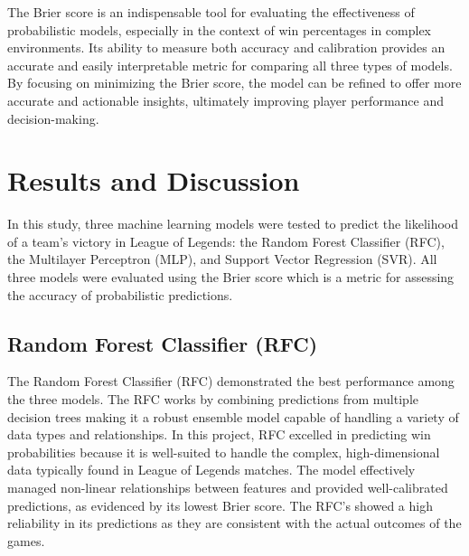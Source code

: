 \documentclass[10pt,twocolumn]{article}
\begin{document}
The Brier score is an indispensable tool for evaluating the effectiveness of probabilistic models, especially in the context of win percentages in complex environments. Its ability to measure both accuracy and calibration provides an accurate and easily interpretable metric for comparing all three types of models. By focusing on minimizing the Brier score, the model can be refined to offer more accurate and actionable insights, ultimately improving player performance and decision-making.


\section{Results and Discussion}

In this study, three machine learning models were tested to predict the likelihood of a team’s victory in League of Legends: the Random Forest Classifier (RFC), the Multilayer Perceptron (MLP), and Support Vector Regression (SVR). All three models were evaluated\cite{hagerty1991comparing} using the Brier score which is a metric for assessing the accuracy of probabilistic predictions.

\subsection{Random Forest Classifier (RFC)}
The Random Forest Classifier (RFC) demonstrated the best performance among the three models. The RFC works by combining predictions from multiple decision trees making it a robust ensemble model capable of handling a variety of data types and relationships. In this project, RFC excelled in predicting win probabilities because it is well-suited to handle the complex, high-dimensional data typically found in League of Legends matches. The model effectively managed non-linear relationships between features and provided well-calibrated predictions, as evidenced by its lowest Brier score. The RFC's showed a high reliability in its predictions as they are consistent with the actual outcomes of the games.
\end{document}
